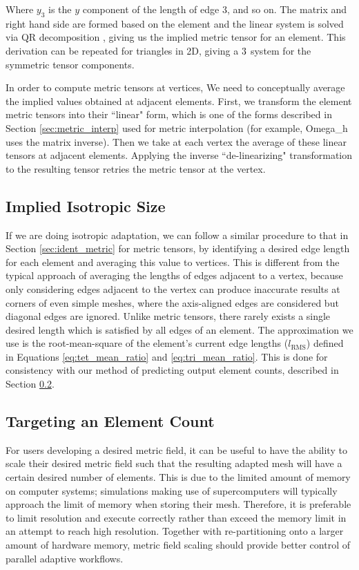 Where $y_3$ is the $y$ component of the length of edge 3,
and so on.
The matrix and right hand side are formed based on the element
and the linear system is solved via QR decomposition
\cite{trefethen1997numerical}, giving us
the implied metric tensor for an element.
This derivation can be repeated for triangles in 2D, giving
a $3\time 3$ system for the symmetric tensor components.

In order to compute metric tensors at vertices,
We need to conceptually average the implied values obtained
at adjacent elements.
First, we transform the element metric tensors into their
``linear" form, which is one of the forms described
in Section \ref{sec:metric_interp} used for metric interpolation
(for example, Omega\_h uses the matrix inverse).
Then we take at each vertex the average of these linear
tensors at adjacent elements.
Applying the inverse ``de-linearizing" transformation to the resulting tensor
retries the metric tensor at the vertex.

\subsection{Implied Isotropic Size}
\label{sec:ident_size}

If we are doing isotropic adaptation, we can follow a
similar procedure to that in Section \ref{sec:ident_metric} for metric tensors,
by identifying a desired edge length for each element and averaging
this value to vertices.
This is different from the typical approach of averaging the lengths of edges
adjacent to a vertex, because only considering edges adjacent to the vertex
can produce inaccurate results at corners of even simple meshes, where the
axis-aligned edges are considered but diagonal edges are ignored.
Unlike metric tensors, there rarely exists a single desired length which is
satisfied by all edges of an element.
The approximation we use is the root-mean-square of the element's current
edge lengths ($l_{\text{RMS}}$) defined in Equations \ref{eq:tet_mean_ratio}
and \ref{eq:tri_mean_ratio}.
This is done for consistency with our method of predicting output element counts,
described in Section \ref{sec:elem_count}.

\subsection{Targeting an Element Count}
\label{sec:elem_count}

For users developing a desired metric field, it can be useful
to have the ability to scale their desired metric field such
that the resulting adapted mesh will have a certain desired number
of elements.
This is due to the limited amount of memory on computer systems;
simulations making use of supercomputers will typically approach
the limit of memory when storing their mesh.
Therefore, it is preferable to limit resolution and execute correctly
rather than exceed the memory limit in an attempt to reach high resolution.
Together with re-partitioning onto a larger amount of hardware memory,
metric field scaling should provide better control of parallel adaptive
workflows.

